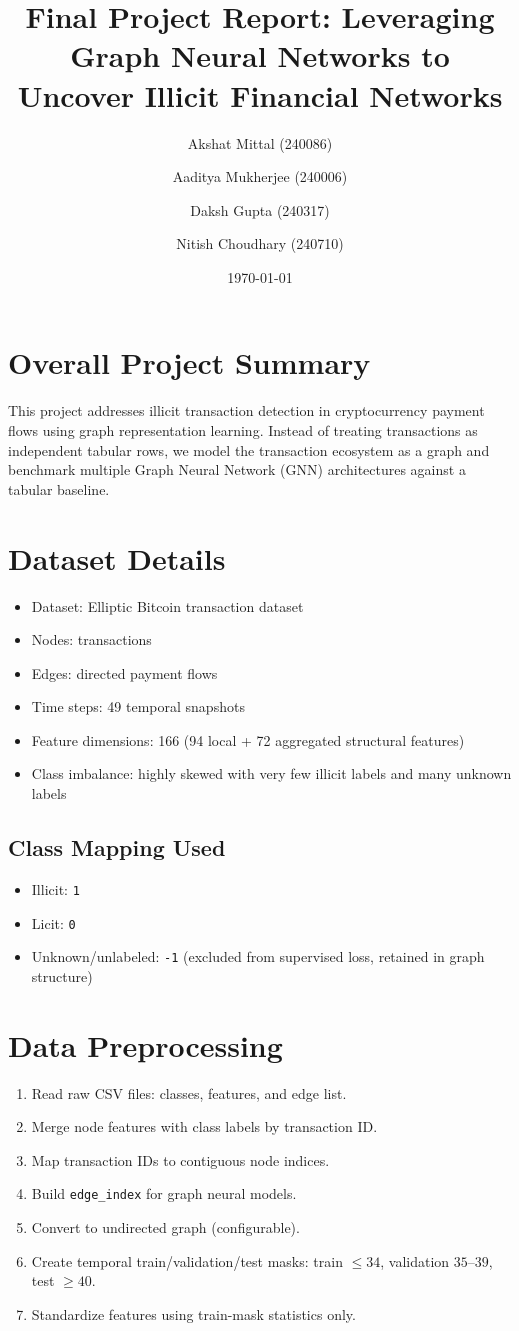 \documentclass[12pt,a4paper]{article}
\title{Final Project Report: Leveraging Graph Neural Networks to Uncover Illicit Financial Networks}
\author{Akshat Mittal (240086) \and Aaditya Mukherjee (240006) \and Daksh Gupta (240317) \and Nitish Choudhary (240710)}
\date{\today}
\begin{document}
\maketitle

\section{Overall Project Summary}
This project addresses illicit transaction detection in cryptocurrency payment flows using graph representation learning. Instead of treating transactions as independent tabular rows, we model the transaction ecosystem as a graph and benchmark multiple Graph Neural Network (GNN) architectures against a tabular baseline.

\section{Dataset Details}
\begin{itemize}
\item Dataset: Elliptic Bitcoin transaction dataset
\item Nodes: transactions
\item Edges: directed payment flows
\item Time steps: 49 temporal snapshots
\item Feature dimensions: 166 (94 local + 72 aggregated structural features)
\item Class imbalance: highly skewed with very few illicit labels and many unknown labels
\end{itemize}

\subsection{Class Mapping Used}
\begin{itemize}
\item Illicit: \texttt{1}
\item Licit: \texttt{0}
\item Unknown/unlabeled: \texttt{-1} (excluded from supervised loss, retained in graph structure)
\end{itemize}

\section{Data Preprocessing}
\begin{enumerate}
\item Read raw CSV files: classes, features, and edge list.
\item Merge node features with class labels by transaction ID.
\item Map transaction IDs to contiguous node indices.
\item Build \texttt{edge\_index} for graph neural models.
\item Convert to undirected graph (configurable).
\item Create temporal train/validation/test masks: train $\leq 34$, validation $35$--$39$, test $\geq 40$.
\item Standardize features using train-mask statistics only.
\end{enumerate}
\end{document}
